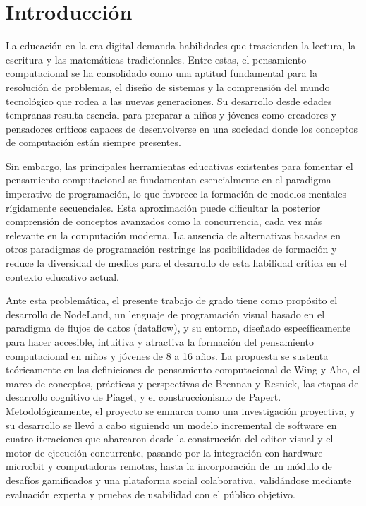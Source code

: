 \chapter*{Introducción}

La educación en la era digital demanda habilidades que trascienden la lectura, la escritura y las matemáticas tradicionales. Entre estas, el pensamiento computacional se ha consolidado como una aptitud fundamental para la resolución de problemas, el diseño de sistemas y la comprensión del mundo tecnológico que rodea a las nuevas generaciones. Su desarrollo desde edades tempranas resulta esencial para preparar a niños y jóvenes como creadores y pensadores críticos capaces de desenvolverse en una sociedad donde los conceptos de computación están siempre presentes.

Sin embargo, las principales herramientas educativas existentes para fomentar el pensamiento computacional se fundamentan esencialmente en el paradigma imperativo de programación, lo que favorece la formación de modelos mentales rígidamente secuenciales. Esta aproximación puede dificultar la posterior comprensión de conceptos avanzados como la concurrencia, cada vez más relevante en la computación moderna. La ausencia de alternativas basadas en otros paradigmas de programación restringe las posibilidades de formación y reduce la diversidad de medios para el desarrollo de esta habilidad crítica en el contexto educativo actual.

Ante esta problemática, el presente trabajo de grado tiene como propósito el desarrollo de NodeLand, un lenguaje de programación visual basado en el paradigma de flujos de datos (dataflow), y su entorno, diseñado específicamente para hacer accesible, intuitiva y atractiva la formación del pensamiento computacional en niños y jóvenes de 8 a 16 años. La propuesta se sustenta teóricamente en las definiciones de pensamiento computacional de Wing y Aho, el marco de conceptos, prácticas y perspectivas de Brennan y Resnick, las etapas de desarrollo cognitivo de Piaget, y el construccionismo de Papert. Metodológicamente, el proyecto se enmarca como una investigación proyectiva, y su desarrollo se llevó a cabo siguiendo un modelo incremental de software en cuatro iteraciones que abarcaron desde la construcción del editor visual y el motor de ejecución concurrente, pasando por la integración con hardware micro:bit y computadoras remotas, hasta la incorporación de un módulo de desafíos gamificados y una plataforma social colaborativa, validándose mediante evaluación experta y pruebas de usabilidad con el público objetivo.

